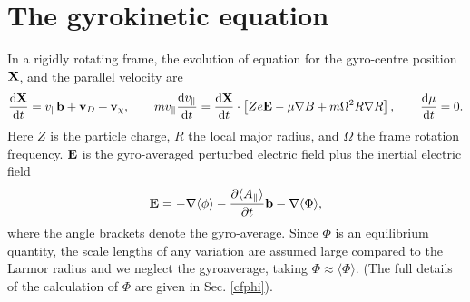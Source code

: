 \section{The gyrokinetic equation}

In a rigidly rotating frame, 
the evolution of equation for the gyro-centre position ${\bf X}$, and the parallel velocity are \cite{PEE09}
\begin{equation} 
{{\rm d} {\bf X} \over {\rm d} t} = v_\parallel {\bf b} + {\bf v}_D + {\bf v}_\chi ,
\qquad
\label{eq:drifts}
m v_\parallel {{\rm d} v_\parallel \over {\rm d} t} =   
{{\rm d} {\bf X} \over {\rm d} t} \cdot \left[ Z {e }{\bf E}  - \mu 
 \nabla B + m\Omega^2 R \nabla R \right],
\qquad 
{{\rm d} \mu \over {\rm d} t} = 0 .
\end{equation}
Here $Z$ is the particle charge, $R$ the local major radius, and $\Omega$ the frame rotation frequency.  
$\bf E$ is the gyro-averaged perturbed electric field plus the inertial electric field
\begin{equation} 
{\bf E} = -\nabla \langle \phi \rangle  - {\partial \langle A_\parallel \rangle \over \partial t} {\bf b}  -\nabla \langle \Phi \rangle ,
\end{equation}
where the angle brackets denote the gyro-average. 
Since $\Phi$ is an equilibrium quantity, the scale lengths of any variation are assumed large compared
to the Larmor radius and we neglect the gyroaverage, taking $\Phi \approx \langle\Phi\rangle$.  (The 
full details of the calculation of $\Phi$ are given in Sec. \ref{cfphi}).  

